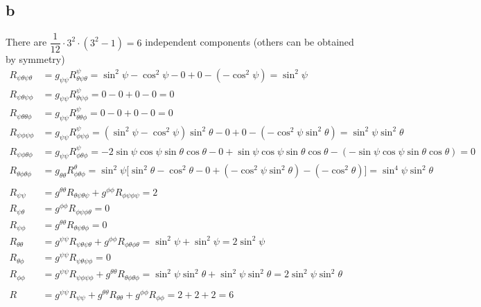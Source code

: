 \documentclass{article}
\begin{document}
\subsection*{b}
There are $\dfrac{1}{12}\cdot3^2\cdot(3^2-1) = 6$ independent components (others can be obtained by symmetry) 
\begin{align*}
R_{\psi\theta\psi\theta} &= g_{\psi\psi}R^{\psi}_{\theta\psi\theta} = \sin^2\psi-\cos^2\psi - 0 + 0 - (-\cos^2\psi) = \sin^2\psi \\
R_{\psi\theta\psi\phi} &= g_{\psi\psi}R^{\psi}_{\theta\psi\phi} = 0 - 0 + 0 - 0 = 0 \\
R_{\psi\theta\theta\phi} &= g_{\psi\psi}R^{\psi}_{\theta\theta\phi} = 0 - 0 + 0 - 0 = 0 \\
R_{\psi\phi\psi\phi} &= g_{\psi\psi}R^{\psi}_{\phi\psi\phi} =  (\sin^2\psi-\cos^2\psi)\sin^2\theta - 0 + 0 - (-\cos^2\psi\sin^2\theta) = \sin^2\psi\sin^2\theta \\
R_{\psi\phi\theta\phi} &= g_{\psi\psi}R^{\psi}_{\phi\theta\phi} = -2\sin\psi\cos\psi\sin\theta\cos\theta - 0 + \sin\psi\cos\psi\sin\theta\cos\theta - (-\sin\psi\cos\psi\sin\theta\cos\theta) = 0 \\
R_{\theta\phi\theta\phi} &= g_{\theta\theta}R^{\theta}_{\phi\theta\phi} = \sin^2\psi\Big[\sin^2\theta -\cos^2\theta - 0 + (-\cos^2\psi\sin^2\theta) - (-\cos^2\theta)\Big] = \sin^4\psi\sin^2\theta \\\\
R_{\psi\psi} &= g^{\theta\theta}R_{\theta\psi\theta\psi} + g^{\phi\phi}R_{\phi\psi\phi\psi} = 2\\
R_{\psi\theta} &= g^{\phi\phi}R_{\phi\psi\phi\theta} = 0\\
R_{\psi\phi} &= g^{\theta\theta}R_{\theta\psi\theta\phi} = 0 \\
R_{\theta\theta} &= g^{\psi\psi}R_{\psi\theta\psi\theta} + g^{\phi\phi}R_{\phi\theta\phi\theta} = \sin^2\psi + \sin^2\psi = 2\sin^2\psi\\
R_{\theta\phi} &= g^{\psi\psi}R_{\psi\theta\psi\phi} = 0\\
R_{\phi\phi} &= g^{\psi\psi}R_{\psi\phi\psi\phi} + g^{\theta\theta}R_{\theta\phi\theta\phi} = \sin^2\psi\sin^2\theta + \sin^2\psi\sin^2\theta = 2\sin^2\psi\sin^2\theta\\\\
R &= g^{\psi\psi}R_{\psi\psi} + g^{\theta\theta}R_{\theta\theta} + g^{\phi\phi}R_{\phi\phi} = 2 + 2 + 2 = 6
\end{align*}
\end{document}
